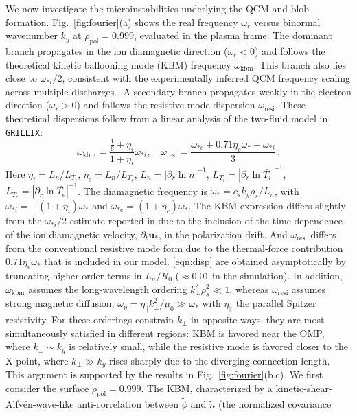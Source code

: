 \documentclass[aps,prl,twocolumn,superscriptaddress]{revtex4-2}
\def  \rpol {\rho_\mathrm{pol}}
\begin{document}
We now investigate the microinstabilities underlying the QCM and blob formation. Fig.~\ref{fig:fourier}(a) shows the real frequency $\omega_r$ versus binormal wavenumber $k_y$ at $\rpol=0.999$, evaluated in the plasma frame. The dominant branch propagates in the ion diamagnetic direction ($\omega_r<0$) and follows the theoretical kinetic ballooning mode (KBM) frequency $\omega_{\mathrm{kbm}}$.
This branch also lies close to $\omega_{*i}/2$, consistent with the experimentally inferred QCM frequency scaling across multiple discharges \cite{kalis2023experimental}.
A secondary branch propagates weakly in the electron direction ($\omega_r>0$) and follows the resistive-mode dispersion $\omega_{\mathrm{resi}}$.
These theoretical dispersions follow from a linear analysis of the two-fluid model in \texttt{GRILLIX}:
\begin{equation}\label{eqn:disp}
\omega_{\mathrm{kbm}}=\frac{\frac{1}{6}+\eta_i}{1+\eta_i}\omega_{*i},\quad
\omega_{\mathrm{resi}} = \frac{\omega_{*e} + 0.71\eta_e\omega_* + \omega_{*i}}{3}\,.
\end{equation}
Here $\eta_i=L_n/L_{T_i}$, $\eta_e=L_n/L_{T_e}$, $L_n=|\partial_r \ln \bar{n} |^{-1}$, $L_{T_i}=|\partial_r \ln \bar{T_i}|^{-1}$, $L_{T_e}=|\partial_r \ln \bar{T_e}|^{-1}$. The diamagnetic frequency is $\omega_*=c_s k_y\rho_s/L_n$, with $\omega_{*i}=-(1+\eta_i)\omega_*$ and $\omega_{*e}=(1+\eta_e)\omega_*$. The KBM expression differs slightly from the $\omega_{*i}/2$ estimate reported in \cite{aleynikova2017quantitative} due to the inclusion of the time dependence of the ion diamagnetic velocity, $\partial_t\mathbf{u}_*$, in the polarization drift. And $\omega_{\mathrm{resi}}$ differs from the conventional resistive mode form \cite{ara1978magnetic,porcelli1986ion,kotschenreuther2019gyrokinetic,gupta2002violating,myra2005edge} due to the thermal-force contribution $0.71\eta_e\omega_*$ that is included in our model.
\eqref{eqn:disp} are obtained asymptotically by truncating higher-order terms in $L_n/R_0$ ($\approx 0.01$ in the simulation).
In addition, $\omega_{\mathrm{kbm}}$ assumes the long-wavelength ordering $k_{\perp}^2\rho_s^2\ll 1$, whereas $\omega_{\mathrm{resi}}$ assumes strong magnetic diffusion, $\omega_{\eta}=\eta_\parallel k_{\perp}^2/\mu_0\gg\omega_*$ with $\eta_\parallel$ the parallel Spitzer resistivity.
For these orderings constrain $k_\perp$ in opposite ways, they are most simultaneously satisfied in different regions: KBM is favored near the OMP, where $k_\perp\sim k_y$ is relatively small, while the resistive mode is favored closer to the X-point, where $k_\perp\gg k_y$ rises sharply due to the diverging connection length.
This argument is supported by the results in Fig.~\ref{fig:fourier}(b,c).
We first consider the surface $\rpol=0.999$.
The KBM, characterized by a kinetic-shear-Alfv\'en-wave-like \cite{doerk2016gyrokinetic} anti-correlation between $\tilde{\phi}$ and $\tilde{n}$ (the normalized covariance
\end{document}
